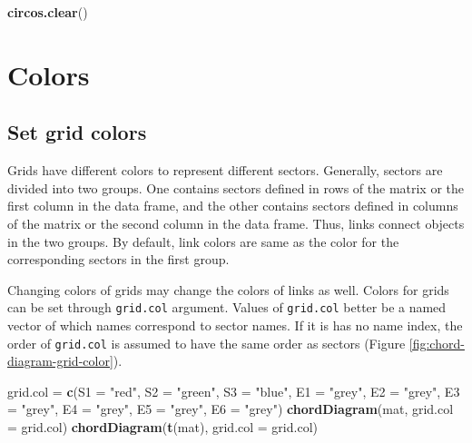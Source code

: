 \documentclass[]{book}
\newenvironment{Shaded}{\begin{snugshade}}{\end{snugshade}}
\newcommand{\KeywordTok}[1]{\textcolor[rgb]{0.13,0.29,0.53}{\textbf{#1}}}
\newcommand{\DataTypeTok}[1]{\textcolor[rgb]{0.13,0.29,0.53}{#1}}
\newcommand{\StringTok}[1]{\textcolor[rgb]{0.31,0.60,0.02}{#1}}
\newcommand{\NormalTok}[1]{#1}
\begin{document}
\begin{Shaded}
\begin{Highlighting}[]
\KeywordTok{circos.clear}\NormalTok{()}
\end{Highlighting}
\end{Shaded}

\section{Colors}\label{chord-diagram-colors}

\subsection{Set grid colors}\label{set-grid-colors}

Grids have different colors to represent different sectors. Generally,
sectors are divided into two groups. One contains sectors defined in
rows of the matrix or the first column in the data frame, and the other
contains sectors defined in columns of the matrix or the second column
in the data frame. Thus, links connect objects in the two groups. By
default, link colors are same as the color for the corresponding sectors
in the first group.

Changing colors of grids may change the colors of links as well. Colors
for grids can be set through \texttt{grid.col} argument. Values of
\texttt{grid.col} better be a named vector of which names correspond to
sector names. If it is has no name index, the order of \texttt{grid.col}
is assumed to have the same order as sectors (Figure
\ref{fig:chord-diagram-grid-color}).

\begin{Shaded}
\begin{Highlighting}[]
\NormalTok{grid.col =}\StringTok{ }\KeywordTok{c}\NormalTok{(}\DataTypeTok{S1 =} \StringTok{"red"}\NormalTok{, }\DataTypeTok{S2 =} \StringTok{"green"}\NormalTok{, }\DataTypeTok{S3 =} \StringTok{"blue"}\NormalTok{,}
    \DataTypeTok{E1 =} \StringTok{"grey"}\NormalTok{, }\DataTypeTok{E2 =} \StringTok{"grey"}\NormalTok{, }\DataTypeTok{E3 =} \StringTok{"grey"}\NormalTok{, }\DataTypeTok{E4 =} \StringTok{"grey"}\NormalTok{, }\DataTypeTok{E5 =} \StringTok{"grey"}\NormalTok{, }\DataTypeTok{E6 =} \StringTok{"grey"}\NormalTok{)}
\KeywordTok{chordDiagram}\NormalTok{(mat, }\DataTypeTok{grid.col =}\NormalTok{ grid.col)}
\KeywordTok{chordDiagram}\NormalTok{(}\KeywordTok{t}\NormalTok{(mat), }\DataTypeTok{grid.col =}\NormalTok{ grid.col)}
\end{Highlighting}
\end{Shaded}
\end{document}
